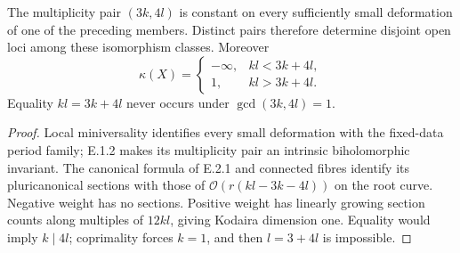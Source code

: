 \begin{proposition}\label{push:src:E.2.2}
The multiplicity pair $(3k,4l)$ is constant on every sufficiently
small deformation of one of the preceding members.  Distinct
pairs therefore determine disjoint open loci among these
isomorphism classes.  Moreover
\[
 \kappa(X)=\begin{cases}-\infty,&kl<3k+4l,\\1,&kl>3k+4l.
 \end{cases}
\]
Equality $kl=3k+4l$ never occurs under $\gcd(3k,4l)=1$.
\end{proposition}
\begin{proof}
Local miniversality identifies every small deformation with the
fixed-data period family; E.1.2 makes its multiplicity pair an
intrinsic biholomorphic invariant.  The canonical formula of
E.2.1 and connected fibres identify its pluricanonical sections
with those of $\mathcal O(r(kl-3k-4l))$ on the root curve.
Negative weight has no sections.  Positive weight has linearly
growing section counts along multiples of $12kl$, giving
Kodaira dimension one.  Equality would imply $k\mid4l$;
coprimality forces $k=1$, and then $l=3+4l$ is impossible.
\end{proof}

